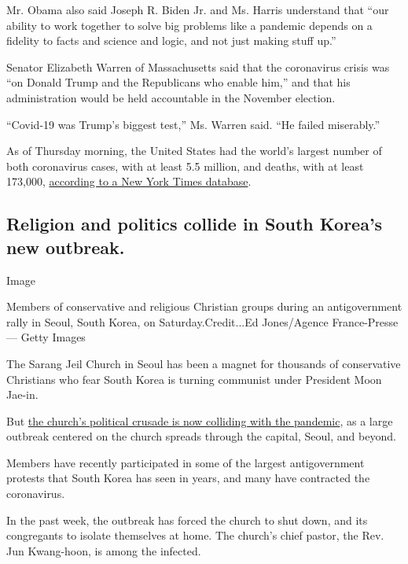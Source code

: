 Mr. Obama also said Joseph R. Biden Jr. and Ms. Harris understand that
``our ability to work together to solve big problems like a pandemic
depends on a fidelity to facts and science and logic, and not just
making stuff up.''

Senator Elizabeth Warren of Massachusetts said that the coronavirus
crisis was ``on Donald Trump and the Republicans who enable him,'' and
that his administration would be held accountable in the November
election.

``Covid-19 was Trump's biggest test,'' Ms. Warren said. ``He failed
miserably.''

As of Thursday morning, the United States had the world's largest number
of both coronavirus cases, with at least 5.5 million, and deaths, with
at least 173,000,
\href{https://www.nytimes3xbfgragh.onion/interactive/2020/us/coronavirus-us-cases.html}{according
to a New York Times database}.

\hypertarget{religion-and-politics-collide-in-south-koreas-new-outbreak}{%
\subsection{Religion and politics collide in South Korea's new
outbreak.}\label{religion-and-politics-collide-in-south-koreas-new-outbreak}}

Image

Members of conservative and religious Christian groups during an
antigovernment rally in Seoul, South Korea, on Saturday.Credit...Ed
Jones/Agence France-Presse --- Getty Images

The Sarang Jeil Church in Seoul has been a magnet for thousands of
conservative Christians who fear South Korea is turning communist under
President Moon Jae-in.

But
\href{https://www.nytimes3xbfgragh.onion/2020/08/20/world/asia/coronavirus-south-korea-church-sarang-jeil.html}{the
church's political crusade is now colliding with the pandemic}, as a
large outbreak centered on the church spreads through the capital,
Seoul, and beyond.

Members have recently participated in some of the largest antigovernment
protests that South Korea has seen in years, and many have contracted
the coronavirus.

In the past week, the outbreak has forced the church to shut down, and
its congregants to isolate themselves at home. The church's chief
pastor, the Rev. Jun Kwang-hoon, is among the infected.

